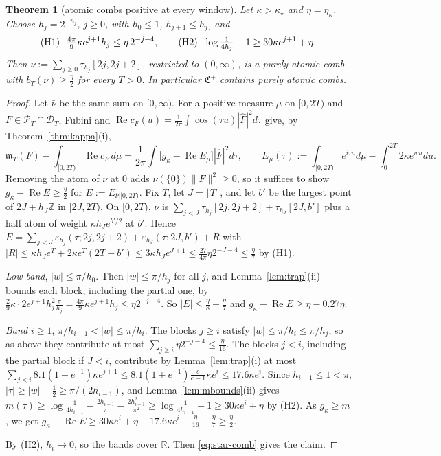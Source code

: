 \documentclass[11pt]{amsart}
\newtheorem{theorem}{Theorem}[section]
\theoremstyle{definition}
\theoremstyle{remark}
\newcommand{\R}{\mathbb R}
\newcommand{\Z}{\mathbb Z}
\newcommand{\Rel}{\operatorname{Re}}
\newcommand{\PT}{\mathcal P_T}
\newcommand{\Fh}{\widehat F}
\newcommand{\cF}{c_F}
\newcommand{\mT}{\mathfrak m_T}
\begin{document}
\begin{theorem}[atomic combs positive at every window]\label{thm:atomic}
Let $\kappa>\kappa_\star$ and $\eta=\eta_\kappa$. Choose $h_j=2^{-n_j}$, $j\ge0$, with $h_0\le1$, $h_{j+1}\le h_j$, and
\[
\textup{(H1)}\ \ \tfrac{4\pi}9\kappa e^{j+1}h_j\le\eta\,2^{-j-4},\qquad
\textup{(H2)}\ \ \log\tfrac1{4h_j}-1\ge30\kappa e^{j+1}+\eta .
\]
Then $\nu:=\sum_{j\ge0}\tau_{h_j}[2j,2j+2]$, restricted to $(0,\infty)$, is a purely atomic comb with $b_T(\nu)\ge\frac\eta2$ for
every $T>0$. In particular $\mathfrak C^+$ contains purely atomic combs.
\end{theorem}

\begin{proof}
Let $\bar\nu$ be the same sum on $[0,\infty)$. For a positive measure $\mu$ on $[0,2T)$ and $F\in\PT\cap\mathcal D_T$, Fubini and
$\Rel\cF(u)=\frac1{2\pi}\int\cos(\tau u)|\Fh|^2d\tau$ give, by Theorem~\ref{thm:kappa}(i),
\begin{equation}\label{eq:star-comb}
\mT(F)-\int_{[0,2T)}\Rel\cF\,d\mu=\frac1{2\pi}\int\big[g_\kappa-\Rel E_\mu\big]|\Fh|^2d\tau,\qquad
E_\mu(\tau):=\int_{[0,2T)}e^{i\tau u}d\mu-\int_0^{2T}2\kappa e^{wu}du .
\end{equation}
Removing the atom of $\bar\nu$ at $0$ adds $\bar\nu(\{0\})\|F\|^2\ge0$, so it suffices to show $g_\kappa-\Rel E\ge\frac\eta2$ for
$E:=E_{\bar\nu|[0,2T)}$. Fix $T$, let $J=\lfloor T\rfloor$, and let $b'$ be the largest point of $2J+h_J\Z$ in $[2J,2T)$. On $[0,2T)$,
$\bar\nu$ is $\sum_{j<J}\tau_{h_j}[2j,2j+2]+\tau_{h_J}[2J,b']$ plus a half atom of weight $\kappa h_Je^{b'/2}$ at $b'$. Hence
$E=\sum_{j<J}\varepsilon_{h_j}(\tau;2j,2j+2)+\varepsilon_{h_J}(\tau;2J,b')+R$ with
$|R|\le\kappa h_Je^{T}+2\kappa e^T(2T-b')\le3\kappa h_Je^{J+1}\le\frac{27}{4\pi}\eta2^{-J-4}\le\frac\eta7$ by (H1).

\emph{Low band}, $|w|\le\pi/h_0$. Then $|w|\le\pi/h_j$ for all $j$, and Lemma~\ref{lem:trap}(ii) bounds each block, including the
partial one, by $\frac29\kappa\cdot2e^{j+1}h_j^2\frac\pi{h_j}=\frac{4\pi}9\kappa e^{j+1}h_j\le\eta2^{-j-4}$. So $|E|\le\frac\eta8+\frac\eta7$
and $g_\kappa-\Rel E\ge\eta-0.27\eta$.

\emph{Band $i\ge1$}, $\pi/h_{i-1}<|w|\le\pi/h_i$. The blocks $j\ge i$ satisfy $|w|\le\pi/h_i\le\pi/h_j$, so as above they contribute at
most $\sum_{j\ge i}\eta2^{-j-4}\le\frac\eta{16}$. The blocks $j<i$, including the partial block if $J<i$, contribute by
Lemma~\ref{lem:trap}(i) at most $\sum_{j<i}8.1(1+e^{-1})\kappa e^{j+1}\le8.1(1+e^{-1})\frac e{e-1}\kappa e^i\le17.6\kappa e^i$.
Since $h_{i-1}\le1<\pi$, $|\tau|\ge|w|-\frac12\ge\pi/(2h_{i-1})$, and Lemma~\ref{lem:mbounds}(ii) gives
$m(\tau)\ge\log\frac1{4h_{i-1}}-\frac{2h_{i-1}}\pi-\frac{2h_{i-1}^2}{\pi^2}\ge\log\frac1{4h_{i-1}}-1\ge30\kappa e^i+\eta$ by (H2). As
$g_\kappa\ge m$, we get $g_\kappa-\Rel E\ge30\kappa e^i+\eta-17.6\kappa e^i-\frac\eta{16}-\frac\eta7\ge\frac\eta2$.

By (H2), $h_i\to0$, so the bands cover $\R$. Then \eqref{eq:star-comb} gives the claim.
\end{proof}
\end{document}
